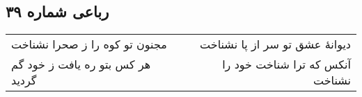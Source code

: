 \begin{center}
\section*{رباعی شماره ۳۹}
\label{sec:sh039}
\begin{longtable}{l p{0.5cm} r}
مجنون تو کوه را ز صحرا نشناخت
&&
دیوانهٔ عشق تو سر از پا نشناخت
\\
هر کس بتو ره یافت ز خود گم گردید
&&
آنکس که ترا شناخت خود را نشناخت
\\
\end{longtable}
\end{center}
